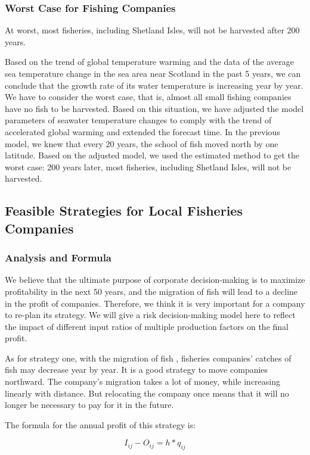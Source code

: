 \documentclass{mcmthesis}
\numberwithin{figure}{section}
\numberwithin{table}{section}
\begin{document}
\subsubsection{Worst Case for Fishing Companies}
At worst, most fisheries, including Shetland Isles, will not be harvested after 200 years.

Based on the trend of global temperature warming and the data of the average sea temperature change in the sea area near Scotland in the past 5 years, we can conclude that the growth rate of its water temperature is increasing year by year. We have to consider the worst case, that is, almost all small fishing companies have no fish to be harvested. Based on this situation, we have adjusted the model parameters of seawater temperature changes to comply with the trend of accelerated global warming and extended the forecast time. In the previous model, we knew that every 20 years, the school of fish moved north by one latitude. Based on the adjusted model, we used the estimated method to get the worst case: 200 years later, most fisheries, including Shetland Isles, will not be harvested.

\subsection{Feasible Strategies for Local Fisheries Companies}

\subsubsection{Analysis and Formula}
We believe that the ultimate purpose of corporate decision-making is to maximize profitability in the next 50 years, and the migration of fish will lead to a decline in the profit of companies. Therefore, we think it is very important for a company to re-plan its strategy. We will give a risk decision-making model here to reflect the impact of different input ratios of multiple production factors on the final profit.

As for strategy one, with the migration of fish , fisheries companies' catches of fish may decrease year by year. It is a good strategy to move companies northward. The company's migration takes a lot of money, while increasing linearly with distance. But relocating the company once means that it will no longer be necessary to pay for it in the future.

The formula for the annual profit of this strategy is:

\begin{equation}\label{1}
  I_{ij} - O_{ij} = h * q_{ij}
  \end{equation}
\end{document}
